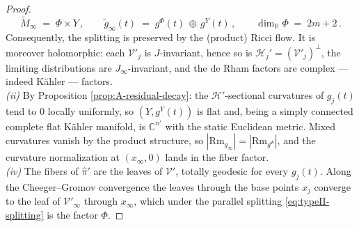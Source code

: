 \documentclass[11pt]{amsart}
\theoremstyle{plain}
\numberwithin{equation}{section}
\theoremstyle{definition}
\theoremstyle{remark}
\begin{document}
\begin{proof}
\begin{equation*}
	\widetilde{M}_\infty \;=\; \Phi \times Y \,, \qquad \widetilde{g}_\infty (t) \;=\; g^\Phi (t) \,\oplus\, g^Y (t) \,, \qquad \dim_{\mathbb{R}} \Phi \;=\; 2 m + 2 \,.
\end{equation*}
Consequently, the splitting is preserved by the (product) Ricci flow. It is moreover holomorphic: each $\mathcal{V}'_j$ is $J$-invariant, hence so is $\mathcal{H}_j' = ( \mathcal{V}'_j )^\perp$, the limiting distributions are $J_\infty$-invariant, and the de Rham factors are complex --- indeed Kähler --- factors.\\


	

	
	 
	

	

	
	\emph{(ii)} By Proposition \ref{prop:A-residual-decay}: the $\mathcal{H}'$-sectional curvatures of $g_j (t)$ tend to $0$ locally uniformly, so $( Y, g^Y (t) )$ is flat and, being a simply connected complete flat K\"{a}hler manifold, is $\mathbb{C}^{n'}$ with the static Euclidean metric. Mixed curvatures vanish by the product structure, so $| \mathrm{Rm}_{g_\infty} | = | \mathrm{Rm}_{g^\Phi} |$, and the curvature normalization at $( x_\infty, 0 )$ lands in the fiber factor.\\
	
	\emph{(iv)} The fibers of $\widehat{\pi}'$ are the leaves of $\mathcal{V}'$, totally geodesic for every $g_j (t)$. Along the Cheeger--Gromov convergence the leaves through the base points $x_j$ converge to the leaf of $\mathcal{V}'_\infty$ through $x_\infty$, which under the parallel splitting \eqref{eq:typeII-splitting} is the factor $\Phi$. %
\end{proof}
\end{document}

